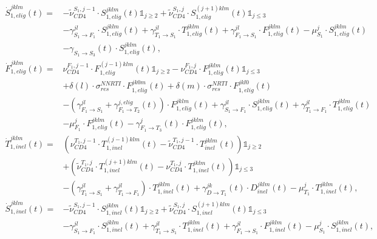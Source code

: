 \documentclass{article}
\begin{document}
\begin{align*}
  \dot{S}_{1,elig}^{jklm}(t) =& -\tilde{\nu}_{CD4}^{S_1,j-1}\cdot S_{1,elig}^{jklm}(t)\mathbb{1}_{j\geq 2}+\tilde{\nu}_{CD4}^{S_1,j}\cdot S_{1,elig}^{(j+1)klm}(t)\mathbb{1}_{j\leq 3}\\
  &-\gamma^{jl}_{S_1\rightarrow F_1}\cdot S_{1,elig}^{jklm}(t)+\gamma^{jl}_{T_1\rightarrow S_1}\cdot T_{1,elig}^{jklm}(t)+\gamma^{jl}_{F_1\rightarrow S_1}\cdot F_{1,elig}^{jklm}(t)-\mu_{S_1}^{j}\cdot S_{1,elig}^{jklm}(t)\\
  &-\gamma_{S_1\rightarrow S_3}^{}(t)\cdot S_{1,elig}^{jklm}(t),\\[16pt]
  \dot{F}_{1,elig}^{jklm}(t) =&\nu_{CD4}^{F_1,j-1}\cdot F_{1,elig}^{(j-1)klm}(t)\mathbb{1}_{j\geq 2}-\nu_{CD4}^{F_1,j}\cdot F_{1,elig}^{jklm}(t)\mathbb{1}_{j\leq 3}\\
  &+\delta(l)\cdot\sigma_{res}^{NNRTI}\cdot F_{1,elig}^{jk0m}(t) +\delta(m)\cdot\sigma_{res}^{NRTI}\cdot F_{1,elig}^{jkl0}(t)\\
 &-(\gamma^{jl}_{F_1\rightarrow S_1}+\gamma^{j,elig}_{F_1\rightarrow T_2}(t)
 )\cdot F_{1,elig}^{jklm}(t)+\gamma^{jl}_{S_1\rightarrow F_1}\cdot S_{1,elig}^{jklm}(t)+\gamma^{jl}_{T_1\rightarrow F_1}\cdot T_{1,elig}^{jklm}(t)\\
 &-\mu_{F_1}^{j}\cdot F_{1,elig}^{jklm}(t)-\gamma_{F_1\rightarrow T_3}^{j}(t)\cdot F_{1,elig}^{jklm}(t),\\[16pt]
  \dot{T}_{1,inel}^{jklm}(t) =& \left(\nu_{CD4}^{T_1,j-1}\cdot T_{1,inel}^{(j-1)klm}(t)-\tilde{\nu}_{CD4}^{T_1,j-1}\cdot T_{inel}^{jklm}(t)\right)\mathbb{1}_{j\geq 2}\\
  &+\left(\tilde{\nu}_{CD4}^{T_1,j}\cdot T_{1,inel}^{(j+1)klm}(t)-\nu_{CD4}^{T_1,j}\cdot T_{1,inel}^{jklm}(t) \right)\mathbb{1}_{j\leq 3}\\
  &-(\gamma^{jl}_{T_1\rightarrow S_1}+\gamma^{jl}_{T_1\rightarrow F_1})\cdot T_{1,inel}^{jklm}(t)+\gamma^{jk}_{D\rightarrow T_1}(t)\cdot D_{inel}^{jklm}(t)-\mu_{T_1}^{j}\cdot T_{1,inel}^{jklm}(t),\\[16pt]
  \dot{S}_{1,inel}^{jklm}(t) =& -\tilde{\nu}_{CD4}^{S_1,j-1}\cdot S_{1,inel}^{jklm}(t)\mathbb{1}_{j\geq 2}+\tilde{\nu}_{CD4}^{S_1,j}\cdot S_{1,inel}^{(j+1)klm}(t)\mathbb{1}_{j\leq 3}\\
  &-\gamma^{jl}_{S_1\rightarrow F_1}
  \cdot S_{1,inel}^{jklm}(t)+\gamma^{jl}_{T_1\rightarrow S_1}\cdot T_{1,inel}^{jklm}(t)+\gamma^{jl}_{F_1\rightarrow S_1}\cdot F_{1,inel}^{jklm}(t)-\mu_{S_1}^{j}\cdot S_{1,inel}^{jklm}(t),\\[16pt]

\end{align*}
\end{document}
